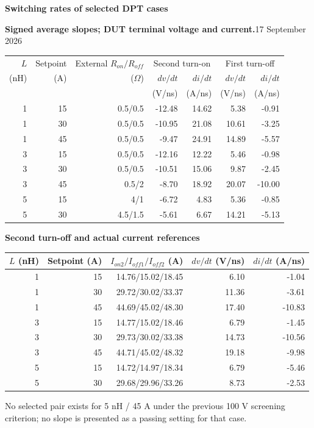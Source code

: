 \documentclass[10pt,a4paper]{article}
\begin{document}
{\LARGE\bfseries\color{navy} Switching rates of selected DPT cases}\par
\textbf{Signed average slopes; DUT terminal voltage and current.}\hfill 17 September 2026

\begin{center}\begin{tabular}{rrrrrrr}\toprule
$L$ & Setpoint & External $R_{on}/R_{off}$ & \multicolumn{2}{c}{Second turn-on} & \multicolumn{2}{c}{First turn-off}\\
(nH) & (A) & ($\Omega$) & $dv/dt$ & $di/dt$ & $dv/dt$ & $di/dt$\\
 & & & (V/ns) & (A/ns) & (V/ns) & (A/ns)\\\midrule
1 & 15 & 0.5/0.5 & -12.48 & 14.62 & 5.38 & -0.91 \\
1 & 30 & 0.5/0.5 & -10.95 & 21.08 & 10.61 & -3.25 \\
1 & 45 & 0.5/0.5 & -9.47 & 24.91 & 14.89 & -5.57 \\
3 & 15 & 0.5/0.5 & -12.16 & 12.22 & 5.46 & -0.98 \\
3 & 30 & 0.5/0.5 & -10.51 & 15.06 & 9.87 & -2.45 \\
3 & 45 & 0.5/2 & -8.70 & 18.92 & 20.07 & -10.00 \\
5 & 15 & 4/1 & -6.72 & 4.83 & 5.36 & -0.85 \\
5 & 30 & 4.5/1.5 & -5.61 & 6.67 & 14.21 & -5.13 \\
\bottomrule\end{tabular}\end{center}
\textbf{Second turn-off and actual current references}
\begin{center}\begin{tabular}{rrrrr}\toprule
$L$ (nH) & Setpoint (A) & $I_{on2}/I_{off1}/I_{off2}$ (A) & $dv/dt$ (V/ns) & $di/dt$ (A/ns)\\\midrule
1 & 15 & 14.76/15.02/18.45 & 6.10 & -1.04 \\
1 & 30 & 29.72/30.02/33.37 & 11.36 & -3.61 \\
1 & 45 & 44.69/45.02/48.30 & 17.40 & -10.83 \\
3 & 15 & 14.77/15.02/18.46 & 6.79 & -1.45 \\
3 & 30 & 29.73/30.02/33.38 & 14.73 & -10.56 \\
3 & 45 & 44.71/45.02/48.32 & 19.18 & -9.98 \\
5 & 15 & 14.72/14.97/18.34 & 6.79 & -5.46 \\
5 & 30 & 29.68/29.96/33.26 & 8.73 & -2.53 \\
\bottomrule\end{tabular}\end{center}
\small No selected pair exists for 5 nH / 45 A under the previous 100 V screening criterion; no slope is presented as a passing setting for that case.\normalsize
\end{document}
